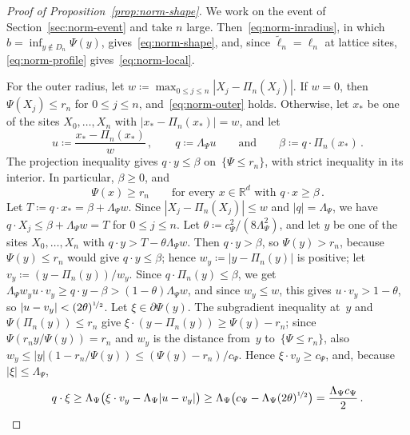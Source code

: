 \documentclass[11pt]{amsart}
\theoremstyle{plain}
\theoremstyle{definition}
\newcommand{\R}{\mathbb R}
\newcommand{\gauge}{\Psi}
\newcommand{\nf}{\nicefrac}
\numberwithin{equation}{section}
\begin{document}
\begin{proof}[Proof of Proposition~\ref{prop:norm-shape}]
We work on the event of Section~\ref{sec:norm-event} and take $n$ large. Then~\eqref{eq:norm-inradius}, in which $b=\inf_{y\notin D_n}\gauge(y)$, gives~\eqref{eq:norm-shape}, and, since $\widetilde\ell_n=\ell_n$ at lattice sites, \eqref{eq:norm-profile} gives~\eqref{eq:norm-local}.

For the outer radius, let $w\coloneqq\max_{0\leq j\leq n}|X_j-\Pi_n(X_j)|$. If $w=0$, then $\gauge(X_j)\leq r_n$ for $0\leq j\leq n$, and~\eqref{eq:norm-outer} holds. Otherwise, let $x_*$ be one of the sites $X_0,\ldots,X_n$ with $|x_*-\Pi_n(x_*)|=w$, and let
\begin{equation*}
u\coloneqq\frac{x_*-\Pi_n(x_*)}{w}\, ,\qquad q\coloneqq\Lambda_\gauge u\qquad\text{and}\qquad\beta\coloneqq q\cdot\Pi_n(x_*)\, .
\end{equation*}
The projection inequality gives $q\cdot y\leq\beta$ on~$\{\gauge\leq r_n\}$, with strict inequality in its interior. In particular, $\beta\geq0$, and
\begin{equation}\label{eq:projection-level}
\gauge(x)\geq r_n\qquad\text{for every }x\in\R^d\text{ with }q\cdot x\geq\beta\, .
\end{equation}
Let $T\coloneqq q\cdot x_*=\beta+\Lambda_\gauge w$. Since $|X_j-\Pi_n(X_j)|\leq w$ and $|q|=\Lambda_\gauge$, we have $q\cdot X_j\leq\beta+\Lambda_\gauge w=T$ for $0\leq j\leq n$. Let $\theta\coloneqq c_\gauge^2/(8\Lambda_\gauge^2)$, and let $y$ be one of the sites $X_0,\ldots,X_n$ with $q\cdot y>T-\theta\Lambda_\gauge w$. Then $q\cdot y>\beta$, so $\gauge(y)>r_n$, because $\gauge(y)\leq r_n$ would give $q\cdot y\leq\beta$; hence $w_y\coloneqq|y-\Pi_n(y)|$ is positive; let $v_y\coloneqq(y-\Pi_n(y))/w_y$. Since $q\cdot\Pi_n(y)\leq\beta$, we get $\Lambda_\gauge w_yu\cdot v_y\geq q\cdot y-\beta>(1-\theta)\Lambda_\gauge w$, and since $w_y\leq w$, this gives $u\cdot v_y>1-\theta$, so $|u-v_y|<(2\theta)^{\nf12}$. Let $\xi\in\partial\gauge(y)$. The subgradient inequality at~$y$ and $\gauge(\Pi_n(y))\leq r_n$ give $\xi\cdot(y-\Pi_n(y))\geq\gauge(y)-r_n$; since $\gauge(r_ny/\gauge(y))=r_n$ and $w_y$ is the distance from~$y$ to~$\{\gauge\leq r_n\}$, also $w_y\leq|y|(1-r_n/\gauge(y))\leq(\gauge(y)-r_n)/c_\gauge$. Hence $\xi\cdot v_y\geq c_\gauge$, and, because $|\xi|\leq\Lambda_\gauge$,
\begin{equation*}
q\cdot\xi\geq\Lambda_\gauge\bigl(\xi\cdot v_y-\Lambda_\gauge|u-v_y|\bigr)\geq\Lambda_\gauge\bigl(c_\gauge-\Lambda_\gauge(2\theta)^{\nf12}\bigr)=\frac{\Lambda_\gauge c_\gauge}2\, .

\end{equation*}
\end{proof}
\end{document}
